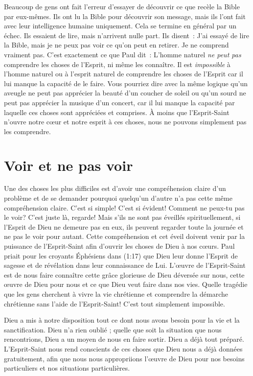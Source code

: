 Beaucoup de gens ont fait l'erreur d'essayer de découvrir ce que recèle
 la Bible par eux-mêmes. Ils ont lu la Bible pour découvrir son message,
 mais ils l'ont fait avec leur intelligence humaine uniquement.
 Cela se termine en général par un échec. Ils essaient de lire,
 mais n'arrivent nulle part. Ils disent~:
 \og J'ai essayé de lire la Bible, mais je ne peux pas voir ce qu'on peut
 en retirer. Je ne comprend vraiment pas. \fg{}
 C'est exactement ce que Paul dit~:
 \og L'homme naturel \emph{ne peut pas} comprendre les choses de l'Esprit,
 ni même les connaître. \fg{}
 Il est \emph{impossible} à l'homme naturel ou à l'esprit naturel
 de comprendre les choses de l'Esprit car il lui manque la capacité
 de le faire. Vous pourriez dire avec la même logique qu'un aveugle
 ne peut pas apprécier la beauté d'un coucher de soleil ou qu'un sourd
 ne peut pas apprécier la musique d'un concert, car il lui manque la capacité
 par laquelle ces choses sont appréciées et comprises.
 À moins que l'Esprit-Saint n'ouvre notre cœur et notre esprit à ces choses,
 nous ne pouvons simplement pas les comprendre.


\section*{Voir et ne pas voir}

Une des choses les plus difficiles est d'avoir une compréhension
 claire d'un problème et de se demander pourquoi quelqu'un d'autre
 n'a pas cette même compréhension claire. C'est si simple!
 C'est si évident! Comment ne peux-tu pas le voir?
 C'est juste là, regarde! Mais s'ils ne sont pas éveillés spirituellement,
 si l'Esprit de Dieu ne demeure pas en eux, ils peuvent regarder
 toute la journée et ne pas le voir pour autant.
 Cette compréhension et cet éveil doivent venir par la puissance
 de l'Esprit-Saint afin d'ouvrir les choses de Dieu à nos cœurs.
 Paul priait pour les croyants Éphésiens dans (1:17)
 que Dieu leur donne l'Esprit de sagesse et de révélation dans leur
 connaissance de Lui. L'œuvre de l'Esprit-Saint est de nous faire
 connaître cette grâce glorieuse de Dieu déversée sur nous,
 cette œuvre de Dieu pour nous et ce que Dieu veut faire dans nos vies.
 Quelle tragédie que les gens cherchent à vivre la vie chrétienne
 et comprendre la démarche chrétienne sans l'aide de l'Esprit-Saint!
 C'est tout simplement impossible.

Dieu a mis à notre disposition tout ce dont nous avons besoin pour la vie
 et la sanctification. Dieu n'a rien oublié ; quelle que soit la situation
 que nous rencontrions, Dieu a un moyen de nous en faire sortir.
 Dieu a déjà tout préparé. L'Esprit-Saint nous rend conscients
 de ces choses que Dieu nous a déjà données gratuitement,
 afin que nous nous appropriions l'œuvre de Dieu pour nos besoins
 particuliers et nos situations particulières.


